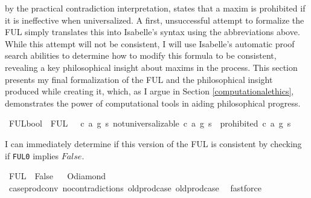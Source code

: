 \begin{isabellebody}
\begin{isamarkuptext}
by the practical contradiction interpretation, states that a maxim is prohibited if it is ineffective
when universalized. A first, unsuccessful attempt to formalize the FUL simply translates this into Isabelle's syntax
using the abbreviations above. While this attempt will not be consistent, I will use Isabelle's automatic
proof search abilities to determine how to modify this formula to be consistent, revealing a key philosophical
insight about maxims in the process. This section presents my final formalization of the FUL and the 
philosophical insight produced while creating it, which, as I argue in Section \ref{computationalethics},
demonstrates the power of computational tools in aiding philosophical progress.%
\end{isamarkuptext}\isamarkuptrue%
\isamarkupfalse%
\ FUL{}{\isacharcolon}{\isacharcolon}bool\ \ {\isachardoublequoteopen}FUL{}\ {\isasymequiv}\ {\isasymforall}\ c\ a\ g\ s{\isachardot}\ not{\isacharunderscore}universalizable\ {\isacharparenleft}c{\isacharcomma}\ a{\isacharcomma}\ g{\isacharparenright}\ s\ {\isasymlongrightarrow}\ {\isasymTurnstile}{\isacharparenleft}{\isacharparenleft}prohibited\ {\isacharparenleft}c{\isacharcomma}\ a{\isacharcomma}\ g{\isacharparenright}\ s{\isacharparenright}{\isacharparenright}{\isachardoublequoteclose}\isanewline
%
%
\begin{isamarkuptext}%
I can immediately determine if this version of the FUL is consistent by checking if \texttt{FUL0} 
implies $False$.%
\end{isamarkuptext}\isamarkuptrue%
\isamarkupfalse%
\ {\isachardoublequoteopen}FUL{}\ {\isasymlongrightarrow}\ False{\isachardoublequoteclose}%
\isadelimproof
\ %
\endisadelimproof
%
\isatagproof
{}\isamarkupfalse%
\ O{\isacharunderscore}diamond\isanewline
\ \ \isamarkupfalse%
\ case{\isacharunderscore}prod{\isacharunderscore}conv\ no{\isacharunderscore}contradictions\ old{\isachardot}prod{\isachardot}case\ old{\isachardot}prod{\isachardot}case\ \isamarkupfalse%
\ fastforce%
\endisatagproof
{\isafoldproof}%
%
\isadelimproof
%
\endisadelimproof

\end{isabellebody}
